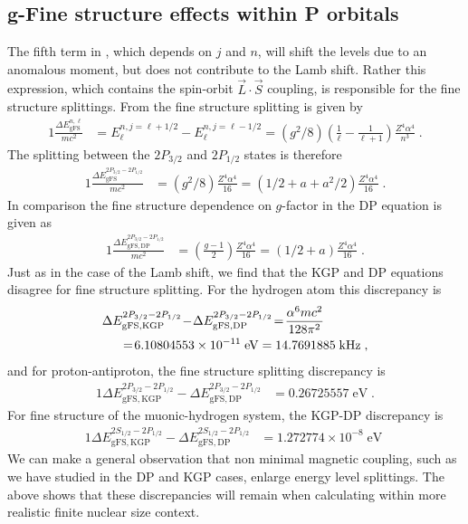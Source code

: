 \subsection{g-Fine structure effects within P orbitals} \label{fs}
The fifth term in , which depends on $j$ and $n$, will shift the levels due to an anomalous moment, but does not contribute to the Lamb shift. Rather this expression, which contains the spin-orbit $\vec{L}\cdot\vec{S}$ coupling, is responsible for the fine structure splittings. From  the fine structure splitting is given by
\begin{alignat}{1}
\label{fs00} \frac{\Delta E_{\mathrm{gFS}}^{n,\ell}}{mc^{2}}&=E^{n,j=\ell+1/2}_{\ell}-E^{n,j=\ell-1/2}_{\ell}=\left(g^{2}/8\right)\left(\frac{1}{\ell}-\frac{1}{\ell+1}\right)\frac{Z^{4}\alpha^{4}}{n^{3}}\;.
\end{alignat}
The splitting between the $2P_{3/2}$ and $2P_{1/2}$ states is therefore
\begin{alignat}{1}
\label{fs01} \frac{\Delta E_{\mathrm{gFS}}^{2P_{3/2}-2P_{1/2}}}{mc^{2}}&=\left(g^{2}/8\right)\frac{Z^{4}\alpha^{4}}{16}=\left(1/2+a+a^{2}/2\right)\frac{Z^{4}\alpha^{4}}{16}\;.
\end{alignat}
In comparison the fine structure dependence on $g$-factor in the DP equation is given as
\begin{alignat}{1}
\label{fs02} \frac{\Delta E_{\mathrm{gFS,DP}}^{2P_{3/2}-2P_{1/2}}}{mc^{2}}&=\left(\frac{g-1}{2}\right)\frac{Z^{4}\alpha^{4}}{16}=\left(1/2+a\right)\frac{Z^{4}\alpha^{4}}{16}\;.
\end{alignat}
Just as in the case of the Lamb shift, we find that the KGP and DP equations disagree for fine structure splitting. For the hydrogen atom this discrepancy is 
\begin{alignat}{1}
\label{fs03} \Delta &E_{\mathrm{gFS,KGP}}^{2P_{3/2}-2P_{1/2}}\!-\!\Delta E_{\mathrm{gFS,DP}}^{2P_{3/2}-2P_{1/2}}\!=\!\frac{\alpha^{6}mc^{2}}{128\pi^{2}}\\ \notag&\;\;=\!6.10804553\times10^{-11}\;\mathrm{eV}=14.7691885\;\mathrm{kHz}\;,\end{alignat}
and for proton-antiproton, the fine structure splitting discrepancy is
\begin{alignat}{1}
\label{fs04} \Delta E_{\mathrm{gFS,KGP}}^{2P_{3/2}-2P_{1/2}}-\Delta E_{\mathrm{gFS,DP}}^{2P_{3/2}-2P_{1/2}}&=0.26725557\;\mathrm{eV}\;.
\end{alignat}
For fine structure of the muonic-hydrogen system, the KGP-DP discrepancy is
\begin{alignat}{1}
\label{fs05} \Delta E_{\mathrm{gFS,KGP}}^{2S_{1/2}-2P_{1/2}}-\Delta E_{\mathrm{gFS,DP}}^{2S_{1/2}-2P_{1/2}}&=\!1.272774\times10^{-8}\;\mathrm{eV}\;
\end{alignat} 
We can make a general observation that non minimal magnetic coupling, such as we have studied in the DP and KGP cases, enlarge energy level splittings. The above shows that these discrepancies will remain when calculating within more realistic finite nuclear size context.

